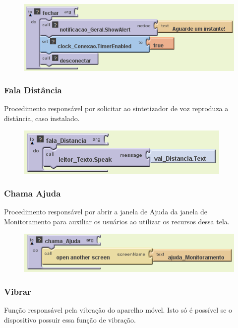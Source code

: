 \documentclass[portugues, brazil, a4paper,12pt]{article}
\begin{document}
\begin{figure}[H]
	\centering
	\includegraphics[scale=.8]{img/monitoramento/fechar.png}
	
\end{figure}


\subsubsection{Fala Distância}
Procedimento responsável por solicitar ao sintetizador de voz reproduza a distância, caso instalado.


\begin{figure}[H]
	\centering
	\includegraphics[scale=.8]{img/monitoramento/falaDistancia.png}
	
\end{figure}

\subsubsection{Chama Ajuda}
Procedimento responsável por abrir a janela de Ajuda da janela de Monitoramento para auxiliar os usuários ao utilizar os recursos dessa tela.

\begin{figure}[H]
	\centering
	\includegraphics[scale=.8]{img/monitoramento/chamaAjuda.png}
	
\end{figure}

\subsubsection{Vibrar}
Função responsável pela vibração do aparelho móvel. Isto só é possível se o dispositivo possuir essa função de vibração.
\end{document}

